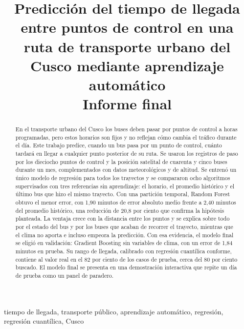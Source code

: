 \documentclass[conference,a4paper]{IEEEtran}
\begin{document}
\title{Predicción del tiempo de llegada entre puntos de control en una ruta de transporte urbano del Cusco mediante aprendizaje automático\\[4pt]
\large Informe final}

\author{
}

\maketitle

\begin{abstract}
En el transporte urbano del Cusco los buses deben pasar por puntos de control a horas programadas, pero estos horarios son fijos y no reflejan cómo cambia el tráfico durante el día. Este trabajo predice, cuando un bus pasa por un punto de control, cuánto tardará en llegar a cualquier punto posterior de su ruta. Se usaron los registros de paso por los dieciocho puntos de control y la posición satelital de cuarenta y cinco buses durante un mes, complementados con datos meteorológicos y de altitud. Se entrenó un único modelo de regresión para todos los trayectos y se compararon ocho algoritmos supervisados con tres referencias sin aprendizaje: el horario, el promedio histórico y el último bus que hizo el mismo trayecto. Con una partición temporal, Random Forest obtuvo el menor error, con 1,90 minutos de error absoluto medio frente a 2,40 minutos del promedio histórico, una reducción de 20,8 por ciento que confirma la hipótesis planteada. La ventaja crece con la distancia entre los puntos y se explica sobre todo por el estado del bus y por los buses que acaban de recorrer el trayecto, mientras que el clima no aporta e incluso empeora la predicción. Con esa evidencia, el modelo final se eligió en validación: Gradient Boosting sin variables de clima, con un error de 1,84 minutos en prueba. Su rango de llegada, calibrado con regresión cuantílica conforme, contiene al valor real en el 82 por ciento de los casos de prueba, cerca del 80 por ciento buscado. El modelo final se presenta en una demostración interactiva que repite un día de prueba como un panel de paradero.
\end{abstract}

\begin{IEEEkeywords}
tiempo de llegada, transporte público, aprendizaje automático, regresión, regresión cuantílica, Cusco
\end{IEEEkeywords}
\end{document}
